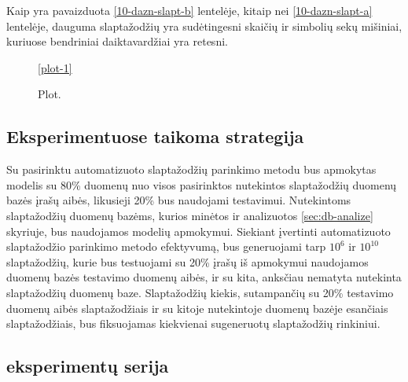 \documentclass{VUMIFInfBakalaurinis}
\begin{document}
Kaip yra pavaizduota \ref{10-dazn-slapt-b} lentelėje, kitaip nei 
\ref{10-dazn-slapt-a} lentelėje, dauguma slaptažodžių yra sudėtingesni skaičių 
ir simbolių sekų mišiniai, kuriuose bendriniai daiktavardžiai yra retesni.

\begin{figure}[!ht]
  \begin{center}
    \ref{plot-1}
    \caption{Plot.}
  \end{center}
\end{figure}

\subsection{Eksperimentuose taikoma strategija}
Su pasirinktu automatizuoto slaptažodžių parinkimo metodu bus apmokytas modelis 
su 80\% duomenų nuo visos pasirinktos nutekintos slaptažodžių duomenų bazės 
įrašų aibės, likusieji 20\% bus naudojami testavimui. Nutekintoms slaptažodžių 
duomenų bazėms, kurios minėtos ir analizuotos \ref{sec:db-analize} skyriuje, bus 
naudojamos modelių apmokymui. Siekiant įvertinti automatizuoto slaptažodžio 
parinkimo metodo efektyvumą, bus generuojami tarp $10^{6}$ ir $10^{10}$ 
slaptažodžių, kurie bus testuojami su 20\% įrašų iš apmokymui naudojamos duomenų 
bazės testavimo duomenų aibės, ir su kita, anksčiau nematyta nutekinta 
slaptažodžių duomenų baze. Slaptažodžių kiekis, sutampančių su 20\% testavimo 
duomenų aibės slaptažodžiais ir su kitoje nutekintoje duomenų bazėje esančiais 
slaptažodžiais, bus fiksuojamas kiekvienai sugeneruotų slaptažodžių rinkiniui.

\subsection{ eksperimentų serija}
\end{document}
